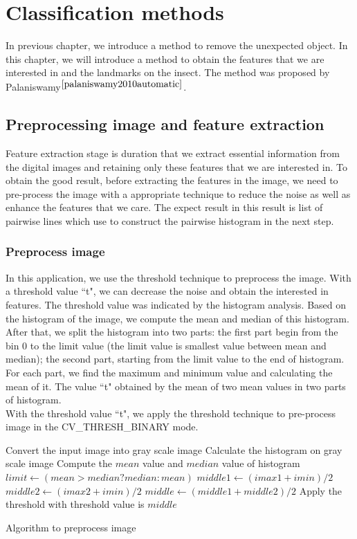 \chapter{Classification methods }
In previous chapter, we introduce a method to remove the unexpected object. In this chapter, we will introduce a method to obtain the features that we are interested in and the landmarks on the insect. The method was proposed by Palaniswamy$^{\cite{palaniswamy2010automatic}}$.
\section{Preprocessing image and feature extraction}
Feature extraction stage is duration that we extract essential information from the digital images and retaining only these features that we are interested in. To obtain the good result, before extracting the features in the image, we need to pre-process the image with a appropriate technique to reduce the noise as well as enhance the features that we care. The expect result in this result is list of pairwise lines which use to construct the pairwise histogram in the next step.
\subsection{Preprocess image}
In this application, we use the threshold technique to preprocess the image. With a threshold value ``t", we can decrease the noise and obtain the interested in features. The threshold value was indicated by the histogram analysis. Based on the histogram of the image, we compute the mean and median of this histogram. After that, we split the histogram into two parts: the first part begin from the bin 0 to the limit value (the limit value is smallest value between mean and median); the second part, starting from the limit value to the end of histogram. For each part, we find the maximum and minimum value and calculating the mean of it. The value ``t" obtained by the mean of two mean values in two parts of histogram.\\
With the threshold value ``t", we apply the threshold technique to pre-process image in the CV\_THRESH\_BINARY mode.\\
\IncMargin{1em}
\begin{algorithm}[H]
\Indm 
{}
\Indp
Convert the input image into gray scale image\;
Calculate the histogram on gray scale image\;
Compute the $mean$ value and $median$ value of histogram\;
$limit \leftarrow (mean > median ? median: mean)$\;
$middle1 \leftarrow (imax1 + imin)/2$ \;
$middle2 \leftarrow (imax2 + imin)/2$ \;
$middle \leftarrow (middle1 + middle2)/2$ \;
Apply the threshold with threshold value is $middle$\;
\caption{Algorithm to preprocess image}
\end{algorithm}\DecMargin{1em}
